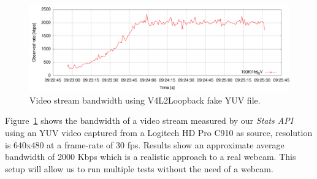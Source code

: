  \begin{figure}[h]
  \centering
    \includegraphics[width=1\textwidth]{./figures/testV4L2niklas.pdf}
      \caption[Video stream bandwidth using V4L2Loopback fake YUV file]{Video stream bandwidth using V4L2Loopback fake YUV file.}
	\label{fig:testV4L2niklas}
\end{figure}

Figure~\ref{fig:testV4L2niklas} shows the bandwidth of a video stream measured by our {\it Stats API} using an YUV video captured from a Logitech HD Pro C910 as source, resolution is 640x480 at a frame-rate of 30 fps. Results show an approximate average bandwidth of 2000 Kbps which is a realistic approach to a real webcam. This setup will allow us to run multiple tests without the need of a webcam.